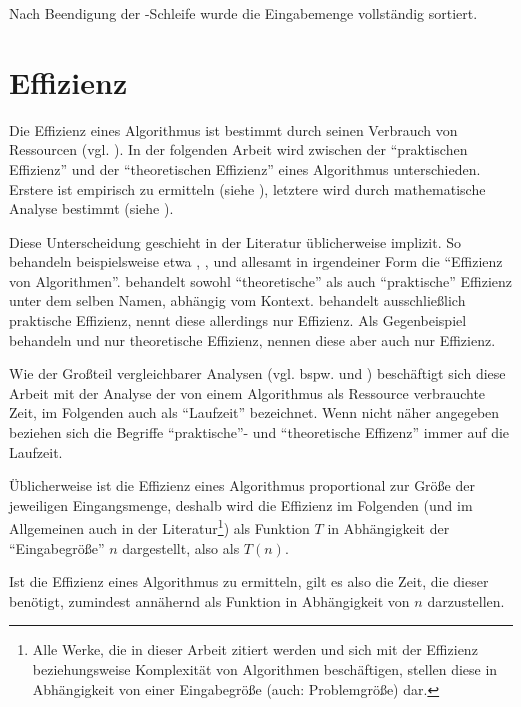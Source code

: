 Nach Beendigung der \For-Schleife wurde die Eingabemenge vollständig sortiert.

\section{Effizienz}
\label{sec:algo-effizienz}

Die Effizienz eines Algorithmus ist bestimmt durch seinen Verbrauch von Ressourcen (vgl. \cite{rp2013}). In der folgenden Arbeit wird zwischen der \enquote{praktischen Effizienz} und der \enquote{theoretischen Effizienz} eines Algorithmus unterschieden. Erstere ist empirisch zu ermitteln (siehe ), letztere wird durch mathematische Analyse bestimmt (siehe ).

Diese Unterscheidung geschieht in der Literatur üblicherweise implizit. So behandeln beispielsweise etwa \cite{mcg2012}, \cite{llx2012}, \cite{rp2013} und \cite{hsr1997} allesamt in irgendeiner Form die \enquote{Effizienz von Algorithmen}. \cite{mcg2012} behandelt sowohl \enquote{theoretische} als auch \enquote{praktische} Effizienz unter dem selben Namen, abhängig vom Kontext. \cite{llx2012} behandelt ausschließlich praktische Effizienz, nennt diese allerdings nur Effizienz. Als Gegenbeispiel behandeln \cite{rp2013} und \cite{hsr1997} nur theoretische Effizienz, nennen diese aber auch nur Effizienz.

Wie der Großteil vergleichbarer Analysen (vgl. bspw. \cite[23]{clrs2001} und \cite[58]{sha2011}) beschäftigt sich diese Arbeit mit der Analyse der von einem Algorithmus als Ressource verbrauchte Zeit, im Folgenden auch als \enquote{Laufzeit} bezeichnet. Wenn nicht näher angegeben beziehen sich die Begriffe \enquote{praktische}- und \enquote{theoretische Effizenz} immer auf die Laufzeit.

Üblicherweise ist die Effizienz eines Algorithmus proportional zur Größe der jeweiligen Eingangsmenge, deshalb wird die Effizienz im Folgenden (und im Allgemeinen auch in der Literatur\footnote{Alle Werke, die in dieser Arbeit zitiert werden und sich mit der Effizienz beziehungsweise Komplexität von Algorithmen beschäftigen, stellen diese in Abhängigkeit von einer Eingabegröße (auch: Problemgröße) dar.}) als Funktion $T$ in Abhängigkeit der \enquote{Eingabegröße} $n$ dargestellt, also als $T(n)$.

Ist die Effizienz eines Algorithmus zu ermitteln, gilt es also die Zeit, die dieser benötigt, zumindest annähernd als Funktion in Abhängigkeit von $n$ darzustellen.
